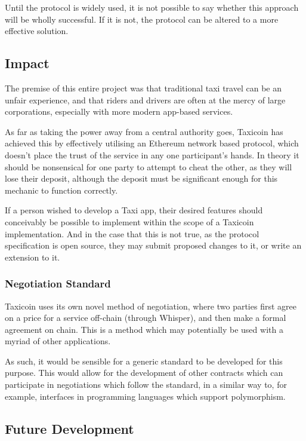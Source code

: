 Until the protocol is widely used, it is not possible to say whether this approach will be wholly successful. If it is not, the protocol can be altered to a more effective solution.

\subsection{Impact}

The premise of this entire project was that traditional taxi travel can be an unfair experience, and that riders and drivers are often at the mercy of large corporations, especially with more modern app-based services.

As far as taking the power away from a central authority goes, Taxicoin has achieved this by effectively utilising an Ethereum network based protocol, which doesn't place the trust of the service in any one participant's hands. In theory it should be nonsensical for one party to attempt to cheat the other, as they will lose their deposit, although the deposit must be significant enough for this mechanic to function correctly.

If a person wished to develop a Taxi app, their desired features should conceivably be possible to implement within the scope of a Taxicoin implementation. And in the case that this is not true, as the protocol specification is open source, they may submit proposed changes to it, or write an extension to it.

\subsubsection{Negotiation Standard}

Taxicoin uses its own novel method of negotiation, where two parties first agree on a price for a service off-chain (through Whisper), and then make a formal agreement on chain. This is a method which may potentially be used with a myriad of other applications.

As such, it would be sensible for a generic standard to be developed for this purpose. This would allow for the development of other contracts which can participate in negotiations which follow the standard, in a similar way to, for example, interfaces in programming languages which support polymorphism.

\subsection{Future Development}

